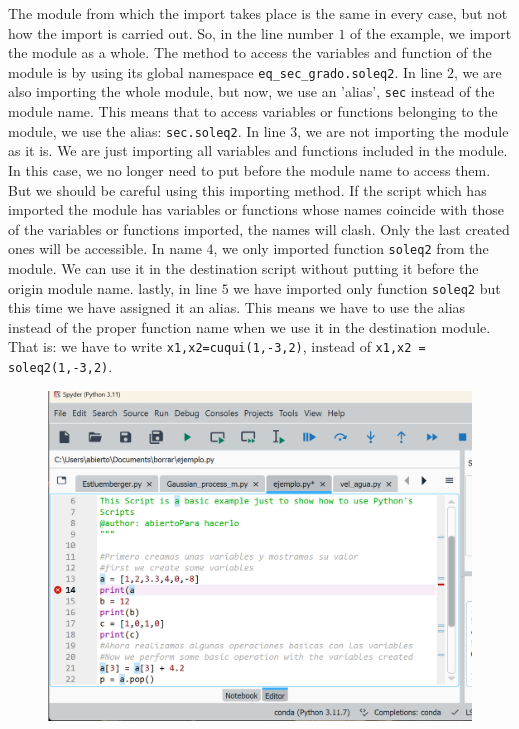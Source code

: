 \begin{paracol}{2}
The module from which the import takes place is the same in every case, but not how the import is carried out. So, in the line number $1$ of the example, we import the module as a whole. The method to access the variables and function of the module is by using its global namespace  \texttt{eq_sec_grado.soleq2}. In line $2$, we are also importing the whole module, but now, we use an 'alias', \texttt{sec} instead of the module name. This means that to access variables or functions belonging to the module, we use the alias: \texttt{sec.soleq2}. In line $3$, we are not importing the module as it is. We are just importing all variables and functions included in the module. In this case, we no longer need to put before the module name to access them.  But we should be careful using this importing method. If the script which has imported the module has variables or functions whose names coincide with those of the variables or functions imported, the names will clash. Only the last created ones will be accessible. In name $4$, we only imported function \texttt{soleq2} from the module. We can use it in the destination script without putting it before the origin module name. lastly, in line $5$  we have imported only function \texttt{soleq2} but this time we have assigned it an alias. This means we have to use the alias instead of the proper function name when we use it in the destination module. That is: we have to write \texttt{x1,x2=cuqui(1,-3,2)}, instead of \texttt{x1,x2 = soleq2(1,-3,2)}.        
\end{paracol}
\begin{figure}[h]
    \centering
    \includegraphics[width=14cm]{figuras/error.png}
    \label{fig:depu0}
\end{figure}
